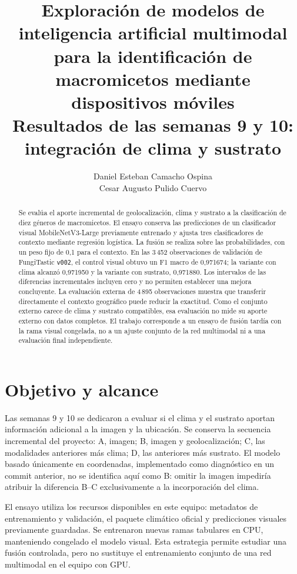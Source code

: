 \documentclass[11pt,a4paper]{article}
\title{\textbf{Exploración de modelos de inteligencia artificial multimodal\\
para la identificación de macromicetos mediante dispositivos móviles}\\[0.6em]
\normalsize Resultados de las semanas 9 y 10: integración de clima y sustrato}
\author{Daniel Esteban Camacho Ospina\\Cesar Augusto Pulido Cuervo}
\date{}
\begin{document}
\maketitle

\begin{abstract}
Se evalúa el aporte incremental de geolocalización, clima y sustrato a la
clasificación de diez géneros de macromicetos. El ensayo conserva las
predicciones de un clasificador visual MobileNetV3-Large previamente entrenado
y ajusta tres clasificadores de contexto mediante regresión logística. La
fusión se realiza sobre las probabilidades, con un peso fijo de 0,1 para el
contexto. En las 3\,452 observaciones de validación de FungiTastic
\texttt{v002}, el control visual obtuvo un F1 macro de 0,971674; la variante
con clima alcanzó 0,971950 y la variante con sustrato, 0,971880. Los intervalos
de las diferencias incrementales incluyen cero y no permiten establecer una
mejora concluyente. La evaluación externa de 4\,895 observaciones muestra que
transferir directamente el contexto geográfico puede reducir la exactitud.
Como el conjunto externo carece de clima y sustrato compatibles, esa evaluación
no mide su aporte externo con datos completos. El trabajo corresponde a un
ensayo de fusión tardía con la rama visual congelada, no a un ajuste conjunto
de la red multimodal ni a una evaluación final independiente.
\end{abstract}

\section{Objetivo y alcance}
Las semanas 9 y 10 se dedicaron a evaluar si el clima y el sustrato aportan
información adicional a la imagen y la ubicación. Se conserva la secuencia
incremental del proyecto: A, imagen; B, imagen y geolocalización; C, las
modalidades anteriores más clima; D, las anteriores más sustrato. El modelo
basado únicamente en coordenadas, implementado como diagnóstico en un commit
anterior, no se identifica aquí como B: omitir la imagen impediría atribuir la
diferencia B--C exclusivamente a la incorporación del clima.

El ensayo utiliza los recursos disponibles en este equipo: metadatos de
entrenamiento y validación, el paquete climático oficial y predicciones
visuales previamente guardadas. Se entrenaron nuevas ramas tabulares en CPU,
manteniendo congelado el modelo visual. Esta estrategia permite estudiar una
fusión controlada, pero no sustituye el entrenamiento conjunto de una red
multimodal en el equipo con GPU.
\end{document}
